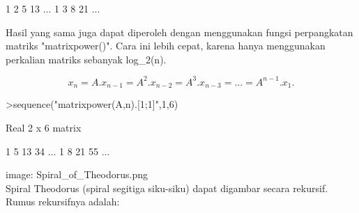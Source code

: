 \documentclass[a4paper,10pt]{article}
\begin{document}
\begin{eulernotebook}
\begin{eulercomment}
\begin{eulercomment}
\begin{eulercomment}
\begin{eulercomment}
\begin{euleroutput}
              1             2             5            13     ...
              1             3             8            21     ...
\end{euleroutput}
\begin{eulercomment}
Hasil yang sama juga dapat diperoleh dengan menggunakan fungsi perpangkatan matriks
"matrixpower()". Cara ini lebih cepat, karena hanya menggunakan perkalian matriks sebanyak
log\_2(n).

\end{eulercomment}
\begin{eulerformula}
\[
x_n=A.x_{n-1}=A^2.x_{n-2}=A^3.x_{n-3}= ... = A^{n-1}.x_1.
\]
\end{eulerformula}
\begin{eulerprompt}
>sequence("matrixpower(A,n).[1;1]",1,6)
\end{eulerprompt}
\begin{euleroutput}
  Real 2 x 6 matrix
  
              1             5            13            34     ...
              1             8            21            55     ...
\end{euleroutput}
\begin{eulercomment}
image: Spiral\_of\_Theodorus.png\\
Spiral Theodorus (spiral segitiga siku-siku) dapat digambar secara rekursif. Rumus
rekursifnya adalah:


\end{eulercomment}
\end{eulercomment}
\end{eulercomment}
\end{eulercomment}
\end{eulercomment}
\end{eulernotebook}
\end{document}
